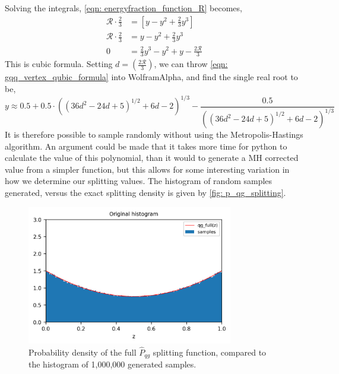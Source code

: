 \documentclass[main.tex]{subfiles}
\begin{document}
Solving the integrals, \autoref{eqn: energyfraction_function_R} becomes,
\begin{align}
    \mathcal{R} \cdot \frac{2}{3} &= \left[ y - y^2 + \frac{2}{3} y^3 \right] \nonumber\\
    \mathcal{R} \cdot \frac{2}{3} &= y - y^2 + \frac{2}{3} y^3 \nonumber \\
    0 &= \frac{2}{3} y^3 - y^2 + y - \frac{2\mathcal{R}}{3} \label{eqn: gqq_vertex_qubic_formula}
\end{align}
This is cubic formula. Setting \(d = (\frac{2\mathcal{R}}{3}) \), we can throw \autoref{eqn: gqq_vertex_qubic_formula} into WolframAlpha, and find the single real root to be,
\begin{equation}\label{eqn: gqq_vacuum_sample}
    y \approx 0.5 + 0.5 \cdot((36 d^2 - 24 d + 5)^{1/2} + 6 d - 2)^{1/3} - \frac{0.5}{((36 d^2 - 24 d + 5)^{1/2} + 6 d - 2)^{1/3}}
\end{equation}
It is therefore possible to sample randomly without using the Metropolis-Hastings algorithm. An argument could be made that it takes more time for python to calculate the value of this polynomial, than it would to generate a MH corrected value from a simpler function, but this allows for some interesting variation in how we determine our splitting values. The histogram of random samples generated, versus the exact splitting density is given by \autoref{fig: p_qg_splitting}.
\begin{figure}[htb]
    \centering
    \includegraphics[width=9cm]{pictures/plots/Metropolis-Hastings/MH_vacuum_qg.png}
    \caption{Probability density of the full \(\hat{P}_{qg}\) splitting function, compared to the histogram of 1,000,000 generated samples.}
    \label{fig: p_qg_splitting}
\end{figure}
\end{document}
